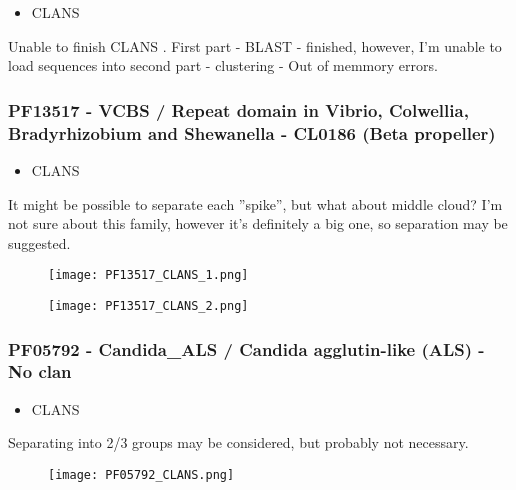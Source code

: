 \begin{itemize}
    \item CLANS
\end{itemize}
Unable to finish CLANS .
First part - BLAST - finished, however, I'm unable to load sequences into second part - clustering - Out of memmory errors.


   \subsubsection{PF13517 - VCBS / Repeat domain in Vibrio, Colwellia, Bradyrhizobium and Shewanella - CL0186 (Beta propeller)}
\begin{itemize}
    \item CLANS
\end{itemize}
It might be possible to separate each ''spike'', but what about middle cloud?
I'm not sure about this family, however it's definitely a big one, so separation may be suggested.

\begin{figure}[H]
\begin{center}
\texttt{[image: PF13517\_CLANS\_1.png]}
\end{center}
\end{figure}

\begin{figure}[H]
\begin{center}
\texttt{[image: PF13517\_CLANS\_2.png]}
\end{center}
\end{figure}

   \subsubsection{PF05792 - Candida\_ALS / Candida agglutin-like (ALS) - No clan}
\begin{itemize}
    \item CLANS
\end{itemize}
Separating into 2/3 groups may be considered, but probably not necessary.

\begin{figure}[H]
\begin{center}
\texttt{[image: PF05792\_CLANS.png]}
\end{center}
\end{figure}

